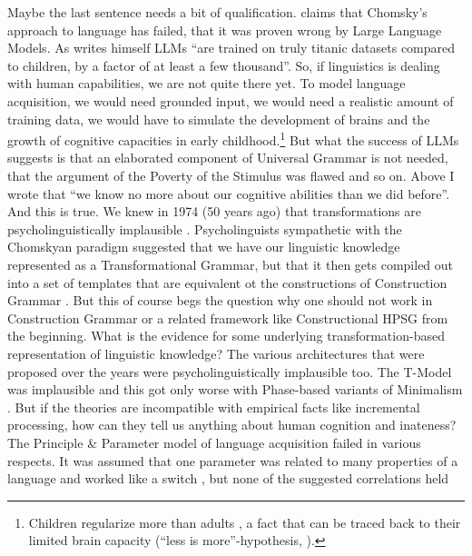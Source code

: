 Maybe the last sentence needs a bit of qualification. \citet{Piantadosi2024a} claims that Chomsky's
approach to language has failed, that it was proven wrong by Large Language Models. As
\citet[366]{Piantadosi2024a} writes himself LLMs ``are trained on truly titanic datasets compared to children, by a factor of at least a few
thousand''. So, if linguistics is dealing with human capabilities, we are not quite there yet. To
model language acquisition, we would need grounded input, we would need a realistic amount of
training data, we would have to simulate the development of brains and the growth of cognitive
capacities in early childhood.\footnote{
  Children regularize more than adults \citep{HudsonN99a,HKN2005a}, a fact that can be traced back to their
  limited brain capacity (``less is more''-hypothesis, \citealp{Newport90a,Elman93a}). 
} But what the success of LLMs suggests is that an elaborated component of Universal
Grammar is not needed, that the argument of the Poverty of the Stimulus was flawed and so on. Above
I wrote that ``we know no more about our cognitive abilities than we did before''. And this is
true. We knew in 1974 (50 years ago) that transformations are psycholinguistically
implausible \citep*[--328]{FBG74a-u}. Psycholinguists sympathetic with the Chomskyan paradigm suggested that we have our
linguistic knowledge represented as a Transformational Grammar, but that it then gets compiled out
into a set of templates that are equivalent ot the constructions of Construction Grammar \citep[]{FC96a-u}. But this
of course begs the question why one should not work in Construction Grammar or a related framework
like Constructional HPSG \citep{Sag97a,HPSGHandbook} from the beginning. What
is the evidence for some underlying transformation-based representation of linguistic knowledge? The
various architectures that were proposed over the years were psycholinguistically implausible
too. The T-Model \citep{Chomsky81a,Chomsky86b} was implausible \citep[Section~15.2]{MuellerGT-Eng5} and this got only worse with
Phase-based variants of Minimalism \parencites{Chomsky95a-u,Chomsky2008a}[,
830]{Richards2015a}[Section~5]{BM2021a}. But if the theories are incompatible with 
empirical facts like incremental processing, how can they tell us anything about human cognition and
inateness? The Principle \& Parameter model of language acquisition \citet[]{Chomsky81a}
failed in various respects. It was assumed that one parameter was related to many properties of a
language and worked like a switch \parencites{Rizzi86a}[]{Chomsky2000a-u}, but none of the suggested correlations held 
